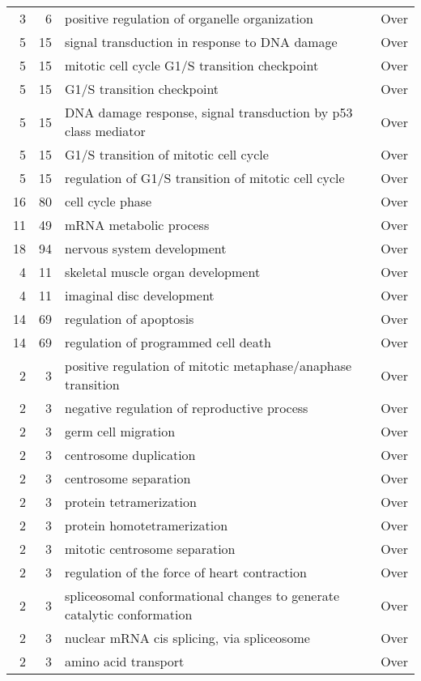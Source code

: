 \documentclass[10pt]{bmc_article}
\newenvironment{bmcformat}{\begin{raggedright}\baselineskip20pt\sloppy\setboolean{publ}{false}}{\end{raggedright}\baselineskip20pt\sloppy}
\begin{document}
\begin{bmcformat}
\begin{longtable}{rrll}
    3 &   6 & positive regulation of organelle organization & Over \\ 
    5 &  15 & signal transduction in response to DNA damage & Over \\ 
    5 &  15 & mitotic cell cycle G1/S transition checkpoint & Over \\ 
    5 &  15 & G1/S transition checkpoint & Over \\ 
    5 &  15 & DNA damage response, signal transduction by p53 class mediator & Over \\ 
    5 &  15 & G1/S transition of mitotic cell cycle & Over \\ 
    5 &  15 & regulation of G1/S transition of mitotic cell cycle & Over \\ 
   16 &  80 & cell cycle phase & Over \\ 
   11 &  49 & mRNA metabolic process & Over \\ 
   18 &  94 & nervous system development & Over \\ 
    4 &  11 & skeletal muscle organ development & Over \\ 
    4 &  11 & imaginal disc development & Over \\ 
   14 &  69 & regulation of apoptosis & Over \\ 
   14 &  69 & regulation of programmed cell death & Over \\ 
    2 &   3 & positive regulation of mitotic metaphase/anaphase transition & Over \\ 
    2 &   3 & negative regulation of reproductive process & Over \\ 
    2 &   3 & germ cell migration & Over \\ 
    2 &   3 & centrosome duplication & Over \\ 
    2 &   3 & centrosome separation & Over \\ 
    2 &   3 & protein tetramerization & Over \\ 
    2 &   3 & protein homotetramerization & Over \\ 
    2 &   3 & mitotic centrosome separation & Over \\ 
    2 &   3 & regulation of the force of heart contraction & Over \\ 
    2 &   3 & spliceosomal conformational changes to generate catalytic conformation & Over \\ 
    2 &   3 & nuclear mRNA cis splicing, via spliceosome & Over \\ 
    2 &   3 & amino acid transport & Over \\ 

\end{longtable}
\end{bmcformat}
\end{document}
